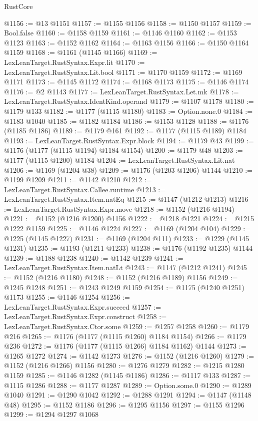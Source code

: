 \begin{lexlean}{RustCore}
\begin{coremodule}
@1156 := @13 @1151
@1157 := @1155 @1156
@1158 := @1150 @1157
@1159 := Bool.false
@1160 := @1158 @1159
@1161 := @1146 @1160
@1162 := @1153 @1123
@1163 := @1152 @1162
@1164 := @1163 @1156
@1166 := @1150 @1164 @1159
@1168 := @1161 (@1145 @1166)
@1169 := LexLeanTarget.RustSyntax.Expr.lit
@1170 := LexLeanTarget.RustSyntax.Lit.bool
@1171 := @1170 @1159
@1172 := @1169 @1171
@1173 := @1145 @1172
@1174 := @1168 @1173
@1175 := @1146 @1174
@1176 := @2 @1143
@1177 := LexLeanTarget.RustSyntax.Let.mk
@1178 := LexLeanTarget.RustSyntax.IdentKind.operand
@1179 := @1107 @1178
@1180 := @1179 @133
@1182 := @1177 (@1115 @1180)
@1183 := Option.none.{0}
@1184 := @1183 @1040
@1185 := @1182 @1184
@1186 := @1153 @1128
@1188 := @1176 (@1185 @1186)
@1189 := @1179 @161
@1192 := @1177 (@1115 @1189) @1184
@1193 := LexLeanTarget.RustSyntax.Expr.block
@1194 := @1179 @43
@1199 := @1176 (@1177 (@1115 @1194) @1184 @1154)
@1200 := @1179 @48
@1203 := @1177 (@1115 @1200) @1184
@1204 := LexLeanTarget.RustSyntax.Lit.nat
@1206 := @1169 (@1204 @38)
@1209 := @1176 (@1203 @1206) @1144
@1210 := @1199 @1209
@1211 := @1142 @1210
@1212 := LexLeanTarget.RustSyntax.Callee.runtime
@1213 := LexLeanTarget.RustSyntax.Item.natEq
@1215 := @1147 (@1212 @1213)
@1216 := LexLeanTarget.RustSyntax.Expr.move
@1218 := @1152 (@1216 @1194)
@1221 := @1152 (@1216 @1200) @1156
@1222 := @1218 @1221
@1224 := @1215 @1222 @1159
@1225 := @1146 @1224
@1227 := @1169 (@1204 @104)
@1229 := @1225 (@1145 @1227)
@1231 := @1169 (@1204 @111)
@1233 := @1229 (@1145 @1231)
@1235 := @1193 (@1211 @1233)
@1238 := @1176 (@1192 @1235) @1144
@1239 := @1188 @1238
@1240 := @1142 @1239
@1241 := LexLeanTarget.RustSyntax.Item.natLt
@1243 := @1147 (@1212 @1241)
@1245 := @1152 (@1216 @1180)
@1248 := @1152 (@1216 @1189) @1156
@1249 := @1245 @1248
@1251 := @1243 @1249 @1159
@1254 := @1175 (@1240 @1251) @1173
@1255 := @1146 @1254
@1256 := LexLeanTarget.RustSyntax.Expr.succeed
@1257 := LexLeanTarget.RustSyntax.Expr.construct
@1258 := LexLeanTarget.RustSyntax.Ctor.some
@1259 := @1257 @1258
@1260 := @1179 @216
@1265 := @1176 (@1177 (@1115 @1260) @1184 @1154)
@1266 := @1179 @236
@1272 := @1176 (@1177 (@1115 @1266) @1184 @1162) @1144
@1273 := @1265 @1272
@1274 := @1142 @1273
@1276 := @1152 (@1216 @1260)
@1279 := @1152 (@1216 @1266) @1156
@1280 := @1276 @1279
@1282 := @1215 @1280 @1159
@1285 := @1146 @1282 (@1145 @1186)
@1286 := @1117 @133
@1287 := @1115 @1286
@1288 := @1177 @1287
@1289 := Option.some.{0}
@1290 := @1289 @1040
@1291 := @1290 @1042
@1292 := @1288 @1291
@1294 := @1147 (@1148 @48)
@1295 := @1152 @1186
@1296 := @1295 @1156
@1297 := @1155 @1296
@1299 := @1294 @1297 @1068

\end{coremodule}
\end{lexlean}
